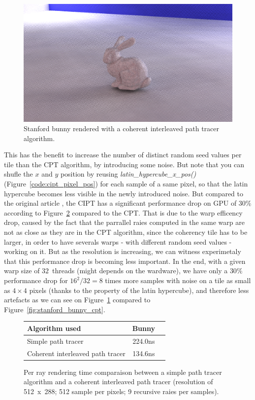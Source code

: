 \begin{figure}[h]
    \centering
    \includegraphics[width=0.8\columnwidth]{render_stanford_bunny.png}
    \caption{Stanford bunny rendered with a coherent interleaved path tracer algorithm.}
    \label{fig:stanford_bunny_cipt}
\end{figure}
This has the benefit to increase the number of distinct random seed values per
tile than the CPT algorithm, by introducing some noise. But note that you can
shufle the $x$ and $y$ position by reusing \textit{latin\_hypercube\_x\_pos()}
(Figure~\ref{code:cipt_pixel_pos}) for each sample of a same pixel, so that the latin
hypercube becomes less visible in the newly introduced noise. But compared to the
original article \cite{cpt}, the CIPT has a significant performance drop on GPU
of 30\% according to Figure~\ref{table:cipt_compare} compared to the CPT. That
is due to the warp efficency drop, caused by the fact that the parrallel raies computed in
the same warp are not as close as they are in the CPT algorithm, since the coherency
tile has to be larger, in order to have severals warps - with different random
seed values - working on it. But as the resolution is increasing, we can witness
experimetaly that this performance drop is becoming less important. In the end,
with a given warp size of $32$~threads (might depends on the wardware), we have only
a $30\%$ performance drop for $16^2 / 32 = 8$ times more samples with noise on a
tile as small as $4 \times 4$ pixels (thanks to the property of the latin hypercube),
and therefore less artefacts as we can see on Figure~\ref{fig:stanford_bunny_cipt}
compared to Figure~\ref{fig:stanford_bunny_cpt}.

\begin{figure}[H]
    \tiny
    \centering
    \begin{tabular}{ | l | c | c | }

        \hline
        Algorithm used & Bunny \\
        \hline
        Simple path tracer & 224.0ns \\
        Coherent interleaved path tracer & 134.6ns \\
        \hline

    \end{tabular}
    \caption{
        Per ray rendering time comparaison between a simple path tracer
        algorithm and a coherent interleaved path tracer (resolution of 512~x~288; 512
        sample per pixels; 9 recursive raies per samples).
    }
    \label{table:cipt_compare}
\end{figure}
